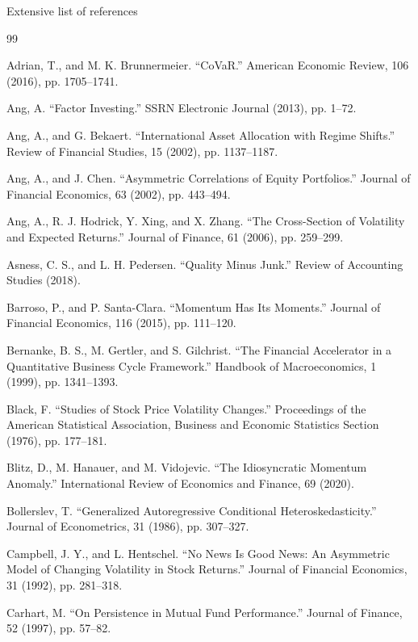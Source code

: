 \documentclass[aspectratio=169,10pt]{beamer}
\begin{document}
\begin{frame}{Extensive list of references}

\begin{thebibliography}{99}

 Adrian, T., and M. K. Brunnermeier. “CoVaR.” American Economic Review, 106 (2016), pp. 1705–1741.

 Ang, A. “Factor Investing.” SSRN Electronic Journal (2013), pp. 1–72.

 Ang, A., and G. Bekaert. “International Asset Allocation with Regime Shifts.” Review of Financial Studies, 15 (2002), pp. 1137–1187.

 Ang, A., and J. Chen. “Asymmetric Correlations of Equity Portfolios.” Journal of Financial Economics, 63 (2002), pp. 443–494.

 Ang, A., R. J. Hodrick, Y. Xing, and X. Zhang. “The Cross-Section of Volatility and Expected Returns.” Journal of Finance, 61 (2006), pp. 259–299.

 Asness, C. S., and L. H. Pedersen. “Quality Minus Junk.” Review of Accounting Studies (2018).

 Barroso, P., and P. Santa-Clara. “Momentum Has Its Moments.” Journal of Financial Economics, 116 (2015), pp. 111–120.

 Bernanke, B. S., M. Gertler, and S. Gilchrist. “The Financial Accelerator in a Quantitative Business Cycle Framework.” Handbook of Macroeconomics, 1 (1999), pp. 1341–1393.

 Black, F. “Studies of Stock Price Volatility Changes.” Proceedings of the American Statistical Association, Business and Economic Statistics Section (1976), pp. 177–181.

 Blitz, D., M. Hanauer, and M. Vidojevic. “The Idiosyncratic Momentum Anomaly.” International Review of Economics and Finance, 69 (2020).

 Bollerslev, T. “Generalized Autoregressive Conditional Heteroskedasticity.” Journal of Econometrics, 31 (1986), pp. 307–327.

 Campbell, J. Y., and L. Hentschel. “No News Is Good News: An Asymmetric Model of Changing Volatility in Stock Returns.” Journal of Financial Economics, 31 (1992), pp. 281–318.

 Carhart, M. “On Persistence in Mutual Fund Performance.” Journal of Finance, 52 (1997), pp. 57–82.


\end{thebibliography}
\end{frame}
\end{document}
